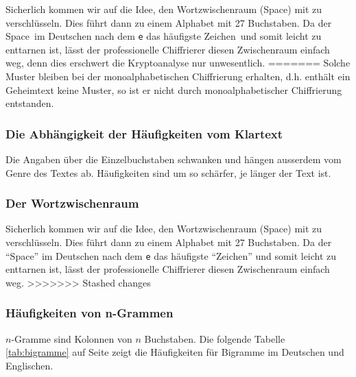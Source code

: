 \documentclass[%
<<<<<<< Updated upstream
11pt,%
twoside,%
titlepage,%
german,%
headsepline%
]{scrartcl}
\begin{document}
Sicherlich kommen wir auf die Idee, den Wortzwischenraum (Space) mit zu verschlüsseln. Dies führt dann zu einem Alphabet mit 27 Buchstaben. Da der \glqq Space\grqq\ im Deutschen nach dem \texttt{e} das häufigste \glqq Zeichen\grqq\ und somit leicht zu enttarnen ist, lässt der professionelle Chiffrierer diesen Zwischenraum einfach weg, denn dies erschwert die Kryptoanalyse nur unwesentlich.
=======
Solche Muster bleiben bei der monoalphabetischen Chiffrierung erhalten, d.h. enthält ein Geheimtext keine Muster, so ist er nicht durch monoalphabetischer Chiffrierung entstanden.

\subsubsection{Die Abhängigkeit der Häufigkeiten vom Klartext}

Die Angaben über die Einzelbuchstaben schwanken und hängen ausserdem vom Genre des Textes ab. Häufigkeiten sind um so schärfer, je länger der Text ist.

\subsubsection{Der Wortzwischenraum}

Sicherlich kommen wir auf die Idee, den Wortzwischenraum (Space) mit zu verschlüsseln. Dies führt dann zu einem Alphabet mit 27 Buchstaben. Da der \enquote{Space} im Deutschen nach dem \texttt{e} das häufigste \enquote{Zeichen} und somit leicht zu enttarnen ist, lässt der professionelle Chiffrierer diesen Zwischenraum einfach weg.
>>>>>>> Stashed changes

\subsubsection{Häufigkeiten von n-Grammen}

$n$-Gramme sind Kolonnen von $n$ Buchstaben. Die folgende Tabelle \ref{tab:bigramme} auf Seite \pageref{tab:bigramme} zeigt die Häufigkeiten für Bigramme im Deutschen und Englischen.
\end{document}
